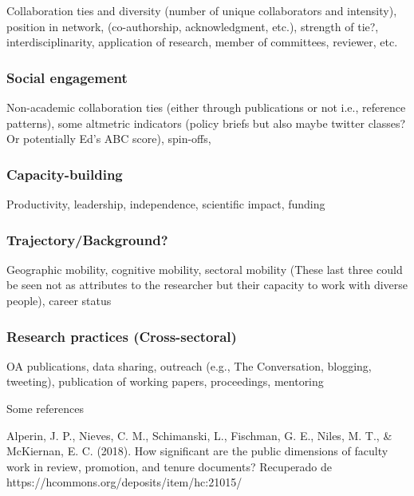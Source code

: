 \documentclass[]{elsarticle} %
\begin{document}
Collaboration ties and diversity (number of unique collaborators and
intensity), position in network, (co-authorship, acknowledgment, etc.),
strength of tie?, interdisciplinarity, application of research, member
of committees, reviewer, etc.

\hypertarget{social-engagement}{%
\subsubsection{Social engagement}\label{social-engagement}}

Non-academic collaboration ties (either through publications or not
i.e., reference patterns), some altmetric indicators (policy briefs but
also maybe twitter classes? Or potentially Ed's ABC score), spin-offs,

\hypertarget{capacity-building}{%
\subsubsection{Capacity-building}\label{capacity-building}}

Productivity, leadership, independence, scientific impact, funding

\hypertarget{trajectorybackground}{%
\subsubsection{Trajectory/Background?}\label{trajectorybackground}}

Geographic mobility, cognitive mobility, sectoral mobility (These last
three could be seen not as attributes to the researcher but their
capacity to work with diverse people), career status

\hypertarget{research-practices-cross-sectoral}{%
\subsubsection{Research practices
(Cross-sectoral)}\label{research-practices-cross-sectoral}}

OA publications, data sharing, outreach (e.g., The Conversation,
blogging, tweeting), publication of working papers, proceedings,
mentoring

Some references

Alperin, J. P., Nieves, C. M., Schimanski, L., Fischman, G. E., Niles,
M. T., \& McKiernan, E. C. (2018). How significant are the public
dimensions of faculty work in review, promotion, and tenure documents?
Recuperado de https://hcommons.org/deposits/item/hc:21015/
\end{document}
